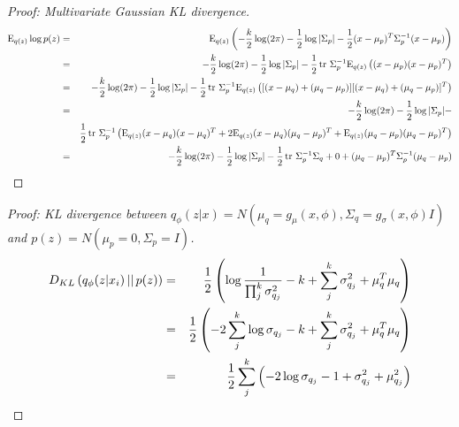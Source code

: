 \begin{proof}[Proof: Multivariate Gaussian KL divergence]
\begin{eqnarray}
\mathrm{E}_{q(z)} \log p(z)
& = &
\mathrm{E}_{q(z)} \left( -\frac{k}{2} \log(2 \pi) -\frac{1}{2} \log|\Sigma_p|  -\frac{1}{2} (x - \mu_p)^T \Sigma_p^{-1} (x - \mu_p) \right) \nonumber \\
& = &
-\frac{k}{2} \log(2 \pi) -\frac{1}{2} \log|\Sigma_p| - \frac{1}{2} \operatorname{tr} \, \Sigma_p^{-1} \mathrm{E}_{q(z)} \left( (x - \mu_p) (x - \mu_p)^T \right) \nonumber \\
& = &
-\frac{k}{2} \log(2 \pi) -\frac{1}{2} \log|\Sigma_p| - \frac{1}{2} \operatorname{tr} \, \Sigma_p^{-1} \mathrm{E}_{q(z)} \left( [(x - \mu_q) + (\mu_q - \mu_p)] [(x - \mu_q) + (\mu_q - \mu_p)]^T \right) \nonumber \\
& = &
-\frac{k}{2} \log(2 \pi) -\frac{1}{2} \log|\Sigma_p| - \nonumber \\
& & \frac{1}{2} \operatorname{tr} \, \Sigma_p^{-1} \left( \mathrm{E}_{q(z)} (x - \mu_q) (x - \mu_q)^T + 2 \mathrm{E}_{q(z)} (x - \mu_q) (\mu_q - \mu_p)^T + \mathrm{E}_{q(z)} (\mu_q - \mu_p) (\mu_q - \mu_p)^T \right) \nonumber \\
& = &
-\frac{k}{2} \log(2 \pi) -\frac{1}{2} \log|\Sigma_p| - \frac{1}{2} \operatorname{tr} \, \Sigma_p^{-1} \Sigma_q + 0 
+ (\mu_q - \mu_p)^T \Sigma_p^{-1} (\mu_q - \mu_p)
\end{eqnarray}

\end{proof}

\begin{proof}[Proof: KL divergence between $q_{\phi}(z|x) = N(\mu_q = g_{\mu}(x,\phi), \Sigma_q = g_{\sigma}(x,\phi) I)$
and $p(z) = N(\mu_p = 0, \Sigma_p = I)$]
\begin{eqnarray}
D_{KL}\left( q_{\phi}(z|x_i) \, || \, p(z)\right) 
& = & \frac{1}{2} \left( \log \frac{1}{\prod_j^k \sigma^2_{q_j}} - k + \sum_j^k \sigma^2_{q_j} + \mu_q^T \mu_q \right) \nonumber \\
& = & \frac{1}{2} \left(- 2 \sum_j^k \log \sigma_{q_j} - k + \sum_j^k \sigma^2_{q_j} + \mu_q^T \mu_q \right) \nonumber \\
& = & \frac{1}{2} \sum_j^k \left(- 2 \log \sigma_{q_j} - 1 + \sigma^2_{q_j} + \mu^2_{q_j} \right)
\end{eqnarray}

\end{proof}



